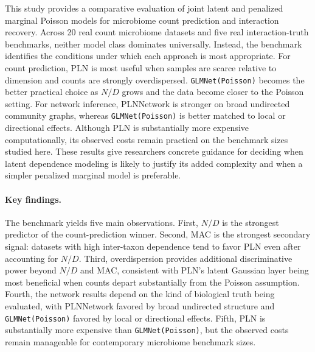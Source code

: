 \documentclass[useAMS,usenatbib,referee]{biom}
\begin{document}
This study provides a comparative evaluation of joint latent and penalized marginal Poisson models for microbiome count prediction and interaction recovery.
Across 20 real count microbiome datasets and five real interaction-truth benchmarks, neither model class dominates universally.
Instead, the benchmark identifies the conditions under which each approach is most appropriate.
For count prediction, PLN is most useful when samples are scarce relative to dimension and counts are strongly overdispersed.
\texttt{GLMNet(Poisson)} becomes the better practical choice as $N/D$ grows and the data become closer to the Poisson setting.
For network inference, PLNNetwork is stronger on broad undirected community graphs, whereas \texttt{GLMNet(Poisson)} is better matched to local or directional effects.
Although PLN is substantially more expensive computationally, its observed costs remain practical on the benchmark sizes studied here.
These results give researchers concrete guidance for deciding when latent dependence modeling is likely to justify its added complexity and when a simpler penalized marginal model is preferable.

\paragraph{Key findings.}
The benchmark yields five main observations.
First, $N/D$ is the strongest predictor of the count-prediction winner.
Second, MAC is the strongest secondary signal: datasets with high inter-taxon dependence tend to favor PLN even after accounting for $N/D$.
Third, overdispersion provides additional discriminative power beyond $N/D$ and MAC, consistent with PLN's latent Gaussian layer being most beneficial when counts depart substantially from the Poisson assumption.
Fourth, the network results depend on the kind of biological truth being evaluated, with PLNNetwork favored by broad undirected structure and \texttt{GLMNet(Poisson)} favored by local or directional effects.
Fifth, PLN is substantially more expensive than \texttt{GLMNet(Poisson)}, but the observed costs remain manageable for contemporary microbiome benchmark sizes.
\end{document}
